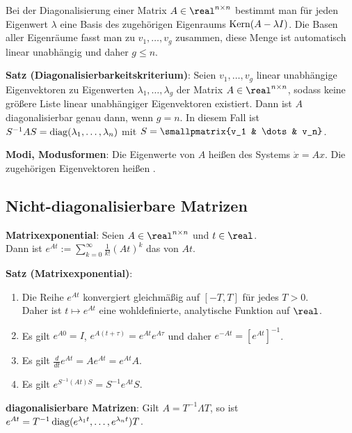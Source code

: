 \linie

Bei der Diagonalisierung einer Matrix $A \in \real^{n \times n}$ bestimmt man für jeden
Eigenwert $\lambda$ eine Basis des zugehörigen Eigenraums $\operatorname{Kern}(A - \lambda I)$.
Die Basen aller Eigenräume fasst man zu $v_1, \dotsc, v_g$ zusammen,
diese Menge ist automatisch linear unabhängig und daher $g \le n$.

\textbf{Satz (Diagonalisierbarkeitskriterium)}:
Seien $v_1, \dotsc, v_g$ linear unabhängige Eigenvektoren zu Eigenwerten
$\lambda_1, \dotsc, \lambda_g$ der Matrix $A \in \real^{n \times n}$,
sodass keine größere Liste linear unabhängiger Eigenvektoren existiert.
Dann ist $A$ diagonalisierbar genau dann, wenn $g = n$.
In diesem Fall ist $S^{-1} A S = \operatorname{diag}(\lambda_1, \dotsc, \lambda_n)$ mit
$S = \smallpmatrix{v_1 & \dots & v_n}$.

\textbf{Modi, Modusformen}:
Die Eigenwerte von $A$ heißen  des Systems $\dot{x} = Ax$.
Die zugehörigen Eigenvektoren heißen .

\subsection{%
    Nicht-diagonalisierbare Matrizen%
}

\textbf{Matrixexponential}:
Seien $A \in \real^{n \times n}$ und $t \in \real$.\\
Dann ist $e^{At} := \sum_{k=0}^\infty \frac{1}{k!} (At)^k$ das 
von $At$.

\textbf{Satz (Matrixexponential)}:
\begin{enumerate}
    \item
    Die Reihe $e^{At}$ konvergiert gleichmäßig auf $[-T, T]$ für jedes $T > 0$.\\
    Daher ist $t \mapsto e^{At}$ eine wohldefinierte, analytische Funktion auf $\real$.

    \item
    Es gilt $e^{A0} = I$, $e^{A(t + \tau)} = e^{At} e^{A\tau}$ und daher $e^{-At} = [e^{At}]^{-1}$.

    \item
    Es gilt $\frac{d}{dt} e^{At} = A e^{At} = e^{At} A$.

    \item
    Es gilt $e^{S^{-1} (At) S} = S^{-1} e^{At} S$.
\end{enumerate}

\textbf{diagonalisierbare Matrizen}:
Gilt $A = T^{-1} \Lambda T$, so ist
$e^{At} = T^{-1} \operatorname{diag}(e^{\lambda_1 t}, \dotsc, e^{\lambda_n t}) T$.

